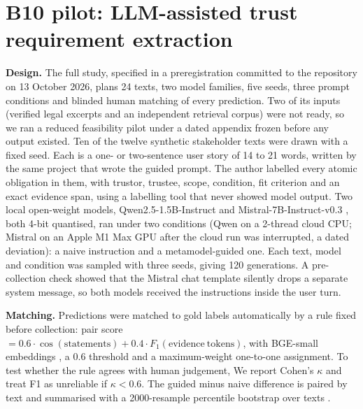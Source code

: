 \documentclass[10pt,twocolumn]{article}
\begin{document}
\section{B10 pilot: LLM-assisted trust requirement extraction}\label{sec:b10}
\textbf{Design.} The full study, specified in a preregistration committed to the repository on 13 October 2026, plans 24 texts, two model families, five seeds, three prompt conditions and blinded human matching of every prediction. Two of its inputs (verified legal excerpts and an independent retrieval corpus) were not ready, so we ran a reduced feasibility pilot under a dated appendix frozen before any output existed. Ten of the twelve synthetic stakeholder texts were drawn with a fixed seed. Each is a one- or two-sentence user story of 14 to 21 words, written by the same project that wrote the guided prompt. The author labelled every atomic obligation in them, with trustor, trustee, scope, condition, fit criterion and an exact evidence span, using a labelling tool that never showed model output. Two local open-weight models, Qwen2.5-1.5B-Instruct \cite{qwen25} and Mistral-7B-Instruct-v0.3 \cite{mistral7b}, both 4-bit quantised, ran under two conditions (Qwen on a 2-thread cloud CPU; Mistral on an Apple M1 Max GPU after the cloud run was interrupted, a dated deviation): a naive instruction and a metamodel-guided one. Each text, model and condition was sampled with three seeds, giving 120 generations. A pre-collection check showed that the Mistral chat template silently drops a separate system message, so both models received the instructions inside the user turn.

\textbf{Matching.} Predictions were matched to gold labels automatically by a rule fixed before collection: pair score $=0.6\cdot\cos(\mathrm{statements}) + 0.4\cdot F_1(\mathrm{evidence\ tokens})$, with BGE-small embeddings \cite{bge}, a 0.6 threshold and a maximum-weight one-to-one assignment. To test whether the rule agrees with human judgement,  We report Cohen's $\kappa$ \cite{cohen1960} and treat F1 as unreliable if $\kappa<0.6$. The guided minus naive difference is paired by text and summarised with a 2000-resample percentile bootstrap over texts \cite{efron1979}.


\end{document}
